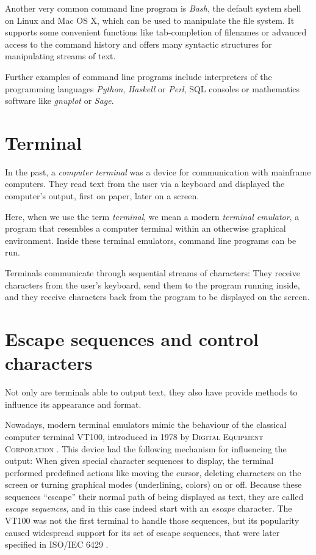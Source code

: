 \documentclass[paper=a4,twoside,abstract=on,cleardoublepage=empty,numbers=noenddot,toc=bib,toc=listof,12pt,appendixprefix=true]{scrreprt}
\begin{document}
\label{sec:cliexamples}

Another very common command line program is \emph{Bash}, the default system shell on Linux and Mac OS X, which can be used to manipulate the file system. It supports some convenient functions like tab-completion of filenames or advanced access to the command history and offers many syntactic structures for manipulating streams of text.

Further examples of command line programs include interpreters of the programming languages \emph{Python}, \emph{Haskell} or \emph{Perl}, SQL consoles or mathematics software like \emph{gnuplot} or \emph{Sage}.

\section{Terminal}

In the past, a \emph{computer terminal} was a device for communication with mainframe computers. They read text from the user via a keyboard and displayed the computer's output, first on paper, later on a screen.

Here, when we use the term \emph{terminal}, we mean a modern \emph{terminal emulator}, a program that resembles a computer terminal within an otherwise graphical environment. Inside these terminal emulators, command line programs can be run.

Terminals communicate through sequential streams of characters: They receive characters from the user's keyboard, send them to the program running inside, and they receive characters back from the program to be displayed on the screen.

\section{Escape sequences and control characters}

Not only are terminals able to output text, they also have provide methods to influence its appearance and format.

Nowadays, modern terminal emulators mimic the behaviour of the classical computer terminal \textsc{VT100}, introduced in 1978 by \textsc{Digital Equipment Corporation} \cite{upt02}. This device had the following mechanism for influencing the output: When given special character sequences to display, the terminal performed predefined actions like moving the cursor, deleting characters on the screen or turning graphical modes (underlining, colors) on or off. Because these sequences “escape” their normal path of being displayed as text, they are called \emph{escape sequences}, and in this case indeed start with an \emph{escape} character. The \textsc{VT100} was not the first terminal to handle those sequences, but its popularity caused widespread support for its set of escape sequences, that were later specified in \textsc{ISO}/\textsc{IEC} 6429 \cite{iso6429}.
\end{document}
